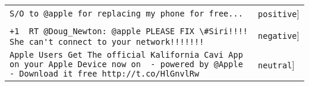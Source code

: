 \begin{tabular}{ll}

\verb'S/O to @apple for replacing my phone for free...' &  \verb'positive'] \\
\verb"+1  RT @Doug_Newton: @apple PLEASE FIX \#Siri!!!!"
\verb" She can't connect to your network!!!!!!!" &  \verb'negative'] \\
\verb'Apple Users Get The official Kalifornia Cavi App'
\verb'on your Apple Device now on  - powered by @Apple'
\verb'- Download it free http://t.co/HlGnvlRw' &  \verb'neutral'] \\

\end{tabular}
